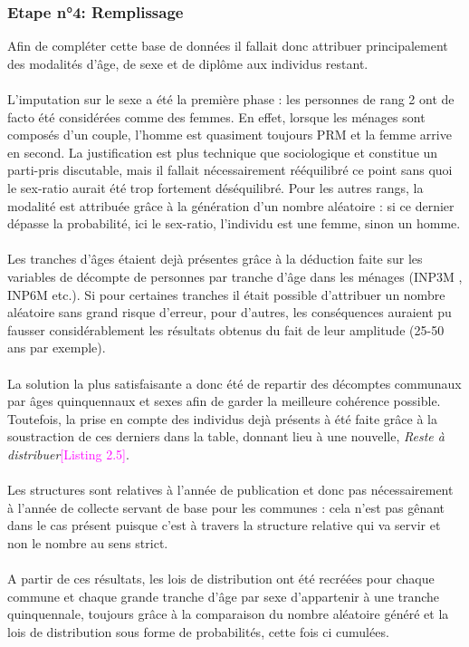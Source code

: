 \documentclass{bredele}
\begin{document}
\subsubsection{Etape n°4: \Large{Remplissage}}
Afin de compléter cette base de données il fallait donc attribuer principalement des modalités d'âge, de sexe et de diplôme aux individus restant.\\\\
L'imputation sur le sexe a été la première phase : les personnes de rang 2 ont de facto été considérées comme des femmes. En effet, lorsque les ménages sont composés d'un couple, l'homme est quasiment toujours PRM et la femme arrive en second. La justification est plus technique que sociologique et constitue un parti-pris discutable, mais il fallait nécessairement rééquilibré ce point sans quoi le sex-ratio aurait été trop fortement déséquilibré. Pour les autres rangs, la modalité est attribuée grâce à la génération d'un nombre aléatoire : si ce dernier dépasse la probabilité, ici le sex-ratio, l'individu est une femme, sinon un homme.\\\\
Les tranches d'âges étaient dejà présentes grâce à la déduction faite sur les variables de décompte de personnes par tranche d'âge dans les ménages (INP3M , INP6M etc.). Si pour certaines tranches il était possible d'attribuer un nombre aléatoire sans grand risque d'erreur, pour d'autres, les conséquences auraient pu fausser considérablement les résultats obtenus du fait de leur amplitude (25-50 ans par exemple).\\\\
La solution la plus satisfaisante a donc été de repartir des décomptes communaux par âges quinquennaux et sexes afin de garder la meilleure cohérence possible. Toutefois, la prise en compte des individus dejà présents à été faite grâce à la soustraction de ces derniers dans la table, donnant lieu à une nouvelle, \textit{Reste à distribuer}\textcolor{magenta}{[Listing 2.5]}.\\\\
Les structures sont relatives à l'année de publication et donc pas nécessairement à l'année de collecte servant de base pour les communes : cela n'est pas gênant dans le cas présent puisque c'est à travers la structure relative qui va servir et non le nombre au sens strict.\\\\
A partir de ces résultats, les lois de distribution ont été recréées pour chaque commune et chaque grande tranche d'âge par sexe d'appartenir à une tranche quinquennale, toujours grâce à la comparaison du nombre aléatoire généré et la lois de distribution sous forme de probabilités, cette fois ci cumulées.\\\\
\end{document}
